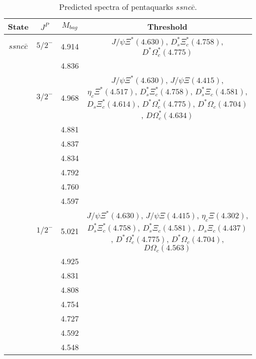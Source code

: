 \documentclass[prd,twocolumn,floatfix,nofootinbib]{revtex4}
\begin{document}
\renewcommand{\tabcolsep}{0.2cm}
\renewcommand{\arraystretch}{1.2}
\begin{table*}[!htbp]
    \caption{Predicted spectra of pentaquarks $ssnc\bar{c}$.}
    \begin{tabular}{cccc}
        \hline\hline
        {\rm State} &$J^{P}$ &$M_{bag}$ &Threshold \\ \hline
        $ssnc\bar{c}$
            &${5/2}^{-}$    &4.914 &$J/\psi\Xi^{\ast}(4.630)$, $D_{s}^{\ast}\Xi_{c}^{\ast}(4.758)$, $D^{\ast}\Omega_{c}^{\ast}(4.775)$ \\
            &               &4.836 & \\
            &${3/2}^{-}$    &4.968 &$J/\psi\Xi^{\ast}(4.630)$, $J/\psi\Xi(4.415)$, $\eta_{c}\Xi^{\ast}(4.517)$, $D_{s}^{\ast}\Xi_{c}^{\ast}(4.758)$, $D_{s}^{\ast}\Xi_{c}(4.581)$, $D_{s}\Xi_{c}^{\ast}(4.614)$, $D^{\ast}\Omega_{c}^{\ast}(4.775)$, $D^{\ast}\Omega_{c}(4.704)$, $D\Omega_{c}^{\ast}(4.634)$ \\
            &               &4.881 & \\
            &               &4.837 & \\
            &               &4.834 & \\
            &               &4.792 & \\
            &               &4.760 & \\
            &               &4.597 & \\
            &${1/2}^{-}$    &5.021 &$J/\psi\Xi^{\ast}(4.630)$, $J/\psi\Xi(4.415)$, $\eta_{c}\Xi(4.302)$, $D_{s}^{\ast}\Xi_{c}^{\ast}(4.758)$, $D_{s}^{\ast}\Xi_{c}(4.581)$, $D_{s}\Xi_{c}(4.437)$, $D^{\ast}\Omega_{c}^{\ast}(4.775)$, $D^{\ast}\Omega_{c}(4.704)$, $D\Omega_{c}(4.563)$ \\
            &               &4.925 & \\
            &               &4.831 & \\
            &               &4.808 & \\
            &               &4.754 & \\
            &               &4.727 & \\
            &               &4.592 & \\
            &               &4.548 & \\
        \hline\hline
    \end{tabular}
\end{table*}
\end{document}
